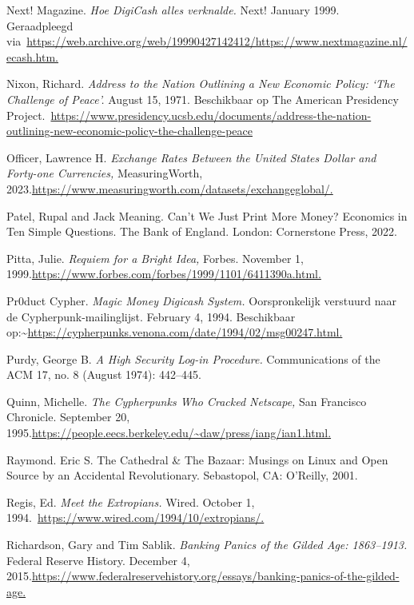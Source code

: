 \documentclass[smalldemyvopaper,11pt,twoside,onecolumn,openright,extrafontsizes,hidelinks]{memoir}
\begin{document}
Next! Magazine. \emph{Hoe DigiCash alles verknalde.} Next! January 1999.
Geraadpleegd
via~\href{https://web.archive.org/web/19990427142412/https:/www.nextmagazine.nl/ecash.htm}{https://web.archive.org/web/19990427142412/https://www.nextmagazine.nl/ecash.htm.}

Nixon, Richard. \emph{Address to the Nation Outlining a New Economic
Policy: `The Challenge of Peace'.} August 15, 1971. Beschikbaar op The
American Presidency
Project.~\url{https://www.presidency.ucsb.edu/documents/address-the-nation-outlining-new-economic-policy-the-challenge-peace}

Officer, Lawrence H. \emph{Exchange Rates Between the United States
Dollar and Forty-one Currencies,} MeasuringWorth,
2023.\href{https://www.measuringworth.com/datasets/exchangeglobal/}{https://www.measuringworth.com/datasets/exchangeglobal/.}

Patel, Rupal and Jack Meaning. Can't We Just Print More Money? Economics
in Ten Simple Questions. The Bank of England. London: Cornerstone Press,
2022.

Pitta, Julie. \emph{Requiem for a Bright Idea,} Forbes. November 1,
1999.\href{https://www.forbes.com/forbes/1999/1101/6411390a.html}{https://www.forbes.com/forbes/1999/1101/6411390a.html.}

Pr0duct Cypher. \emph{Magic Money Digicash System.} Oorspronkelijk
verstuurd naar de Cypherpunk-mailinglijst. February 4, 1994. Beschikbaar
op:\textasciitilde{}\href{https://cypherpunks.venona.com/date/1994/02/msg00247.html}{https://cypherpunks.venona.com/date/1994/02/msg00247.html.}

Purdy, George B. \emph{A High Security Log-in Procedure.} Communications
of the ACM 17, no. 8 (August 1974): 442--445.

Quinn, Michelle. \emph{The Cypherpunks Who Cracked Netscape,} San
Francisco Chronicle. September 20,
1995.\href{https://people.eecs.berkeley.edu/~daw/press/iang/ian1.html}{https://people.eecs.berkeley.edu/\textasciitilde daw/press/iang/ian1.html.}

Raymond. Eric S. The Cathedral \& The Bazaar: Musings on Linux and Open
Source by an Accidental Revolutionary. Sebastopol, CA: O'Reilly, 2001.

Regis, Ed. \emph{Meet the Extropians.} Wired. October 1,
1994.{\hspace{0pt}}~\href{https://www.wired.com/1994/10/extropians/}{https://www.wired.com/1994/10/extropians/.}

Richardson, Gary and Tim Sablik. \emph{Banking Panics of the Gilded Age:
1863--1913.} Federal Reserve History. December 4,
2015.\href{https://www.federalreservehistory.org/essays/banking-panics-of-the-gilded-age}{https://www.federalreservehistory.org/essays/banking-panics-of-the-gilded-age.}
\end{document}
